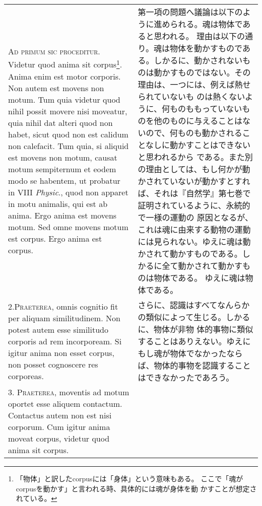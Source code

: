\documentclass[paper=a4paper,fontsize=10pt,jafontsize=9pt,titlepage]{jlreq}
\begin{document}
\begin{longtable}{p{21em}p{21em}}



{\scshape Ad primum sic proceditur}. Videtur quod anima sit
 corpus\footnote{「物体」と訳したcorpusには「身体」という意味もある。
ここで「魂がcorpusを動かす」と言われる時、具体的には魂が身体を動
かすことが想定されている。}. Anima enim
est motor corporis. Non autem est movens non motum. Tum quia videtur
quod nihil possit movere nisi moveatur, quia nihil dat alteri quod non
habet, sicut quod non est calidum non calefacit. Tum quia, si aliquid
est movens non motum, causat motum sempiternum et eodem modo se
habentem, ut probatur in VIII {\itshape Physic}., quod non apparet in motu
animalis, qui est ab anima. Ergo anima est movens motum. Sed omne
movens motum est corpus. Ergo anima est corpus.

&

第一項の問題へ議論は以下のように進められる。魂は物体であると思われる。
理由は以下の通り。魂は物体を動かすものである。しかるに、動かされないも
のは動かすものではない。その理由は、一つには、例えば熱せられていないも
のは熱くないように、何ものももっていないものを他のものに与えることはな
いので、何ものも動かされることなしに動かすことはできないと思われるから
である。また別の理由としては、もし何かが動かされていないが動かすとすれ
ば、それは『自然学』第七巻で証明されているように、永続的で一様の運動の
原因となるが、これは魂に由来する動物の運動には見られない。ゆえに魂は動
かされて動かすものである。しかるに全て動かされて動かすものは物体である。
ゆえに魂は物体である。


\\



2.{\scshape Praeterea}, omnis cognitio fit per aliquam
similitudinem. Non potest autem esse similitudo corporis ad rem
incorpoream. Si igitur anima non esset corpus, non posset cognoscere
res corporeas.



&

さらに、認識はすべてなんらかの類似によって生じる。しかるに、物体が非物
体的事物に類似することはありえない。ゆえにもし魂が物体でなかったなら
ば、物体的事物を認識することはできなかったであろう。


\\

3. {\scshape Praeterea}, moventis ad motum oportet esse aliquem
contactum. Contactus autem non est nisi corporum. Cum igitur anima
moveat corpus, videtur quod anima sit corpus.



\end{longtable}
\end{document}
